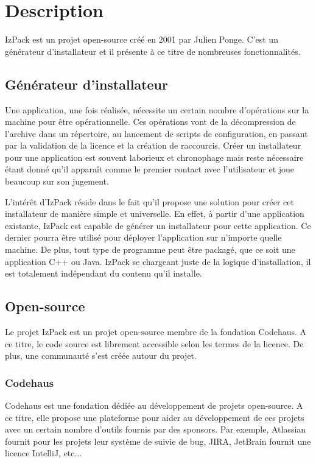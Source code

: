 \section{Description}
IzPack est un projet open-source créé en 2001 par Julien Ponge.
C'est un générateur d'installateur et il présente à ce titre de nombreuses fonctionnalités.
\subsection{Générateur d'installateur}
Une application, une fois réalisée, nécessite un certain nombre d'opérations sur la machine pour être opérationnelle.
Ces opérations vont de la décompression de l'archive dans un répertoire, au lancement de scripts de configuration, en passant par la validation de la licence et la création de raccourcis.
Créer un installateur pour une application est souvent laborieux et chronophage mais reste nécessaire étant donné qu'il apparaît comme le premier contact avec l'utilisateur et joue beaucoup sur son jugement.

L'intérêt d'IzPack réside dans le fait qu'il propose une solution pour créer cet installateur de manière simple et universelle.
En effet, à partir d'une application existante, IzPack est capable de générer un installateur pour cette application.
Ce dernier pourra être utilisé pour déployer l'application sur n'importe quelle machine.
De plus, tout type de programme peut être packagé, que ce soit une application C++ ou Java.
IzPack se chargeant juste de la logique d'installation, il est totalement indépendant du contenu qu'il installe.

\subsection{Open-source}
Le projet IzPack est un projet open-source membre de la fondation Codehaus.
A ce titre, le code source est librement accessible selon les termes de la licence. De plus, une communauté s'est créée autour du projet.
\subsubsection{Codehaus}
Codehaus est une fondation dédiée au développement de projets open-source.
A ce titre, elle propose une plateforme pour aider au développement de ces projets avec un certain nombre d'outils fournis par des sponsors.
Par exemple, Atlassian fournit pour les projets leur système de suivie de bug, JIRA, JetBrain fournit une licence IntelliJ, etc...

